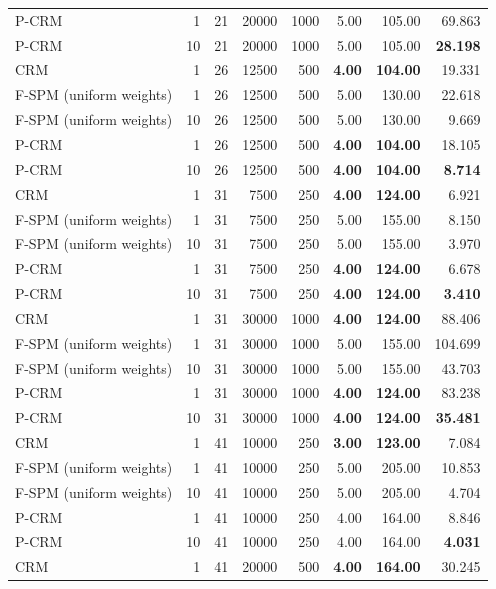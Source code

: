 \begin{tabular}{lrrrrrrr}
P-CRM & 1 & 21 & 20000 & 1000 & 5.00 & 105.00 & 69.863 \\
P-CRM & 10 & 21 & 20000 & 1000 & 5.00 & 105.00 & \textbf{28.198} \\
\midrule
CRM & 1 & 26 & 12500 & 500 & \textbf{4.00} & \textbf{104.00} & 19.331 \\
F-SPM (uniform weights) & 1 & 26 & 12500 & 500 & 5.00 & 130.00 & 22.618 \\
F-SPM (uniform weights) & 10 & 26 & 12500 & 500 & 5.00 & 130.00 & 9.669 \\
P-CRM & 1 & 26 & 12500 & 500 & \textbf{4.00} & \textbf{104.00} & 18.105 \\
P-CRM & 10 & 26 & 12500 & 500 & \textbf{4.00} & \textbf{104.00} & \textbf{8.714} \\
\midrule
CRM & 1 & 31 & 7500 & 250 & \textbf{4.00} & \textbf{124.00} & 6.921 \\
F-SPM (uniform weights) & 1 & 31 & 7500 & 250 & 5.00 & 155.00 & 8.150 \\
F-SPM (uniform weights) & 10 & 31 & 7500 & 250 & 5.00 & 155.00 & 3.970 \\
P-CRM & 1 & 31 & 7500 & 250 & \textbf{4.00} & \textbf{124.00} & 6.678 \\
P-CRM & 10 & 31 & 7500 & 250 & \textbf{4.00} & \textbf{124.00} & \textbf{3.410} \\
\midrule
CRM & 1 & 31 & 30000 & 1000 & \textbf{4.00} & \textbf{124.00} & 88.406 \\
F-SPM (uniform weights) & 1 & 31 & 30000 & 1000 & 5.00 & 155.00 & 104.699 \\
F-SPM (uniform weights) & 10 & 31 & 30000 & 1000 & 5.00 & 155.00 & 43.703 \\
P-CRM & 1 & 31 & 30000 & 1000 & \textbf{4.00} & \textbf{124.00} & 83.238 \\
P-CRM & 10 & 31 & 30000 & 1000 & \textbf{4.00} & \textbf{124.00} & \textbf{35.481} \\
\midrule
CRM & 1 & 41 & 10000 & 250 & \textbf{3.00} & \textbf{123.00} & 7.084 \\
F-SPM (uniform weights) & 1 & 41 & 10000 & 250 & 5.00 & 205.00 & 10.853 \\
F-SPM (uniform weights) & 10 & 41 & 10000 & 250 & 5.00 & 205.00 & 4.704 \\
P-CRM & 1 & 41 & 10000 & 250 & 4.00 & 164.00 & 8.846 \\
P-CRM & 10 & 41 & 10000 & 250 & 4.00 & 164.00 & \textbf{4.031} \\
\midrule
CRM & 1 & 41 & 20000 & 500 & \textbf{4.00} & \textbf{164.00} & 30.245 \\

\end{tabular}

